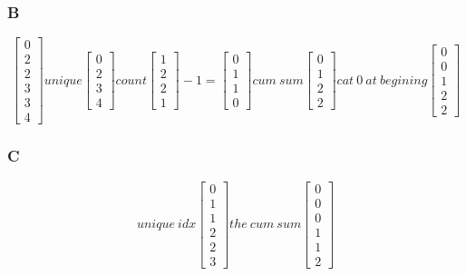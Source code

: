 \documentclass[,table,dvipsnames]{article}
\begin{document}
\subsubsection{B}
\[  
\begin{bmatrix}
0 \\ 2 \\ 2 \\ 3 \\3 \\ 4 
\end{bmatrix}
unique
\begin{bmatrix}
0 \\ 2 \\ 3 \\ 4 
\end{bmatrix} 
count
\begin{bmatrix}
1 \\ 2 \\ 2 \\ 1
\end{bmatrix} 
-1=
\begin{bmatrix}
0 \\ 1 \\ 1 \\ 0
\end{bmatrix}
cum\ sum
\begin{bmatrix}
0 \\ 1 \\ 2 \\ 2
\end{bmatrix}
cat\ 0\ at\ begining
\begin{bmatrix}
0\\ 0 \\ 1 \\ 2 \\ 2
\end{bmatrix}
\]

\subsubsection{C}
\[  unique\ idx
\begin{bmatrix}
0 \\ 1 \\ 1 \\ 2 \\ 2 \\3 
\end{bmatrix}
the\ cum\ sum
\begin{bmatrix}
0 \\ 0 \\ 0 \\ 1 \\ 1 \\2 
\end{bmatrix}
\]
\end{document}
